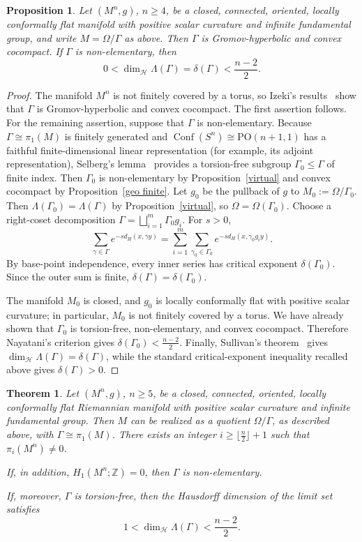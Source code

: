 \documentclass[12pt,oneside,a4paper]{article}
\newtheorem{proposition}[definition]{Proposition}
\theoremstyle{mytheorem}
\newtheorem{theorem}[definition]{Theorem}
\theoremstyle{remark}
\theoremstyle{definition}
\begin{document}
\begin{proposition}\label{prop:standing}
Let $(M^n,g)$, $n\geq4$, be a closed, connected, oriented, locally
conformally flat manifold with positive scalar curvature and infinite
fundamental group, and write $M=\Omega/\Gamma$ as above. Then $\Gamma$ is
Gromov-hyperbolic and convex
cocompact. If $\Gamma$ is non-elementary, then
\[
0<\dim_{\mathcal H}\Lambda(\Gamma)=\delta(\Gamma)<\frac{n-2}{2}.
\]
\end{proposition}

\begin{proof}
The manifold $M^n$ is not finitely covered by a torus, so
Izeki's results~\cite[Theorems~2 and~3]{zbMATH01785298} show that $\Gamma$ is
Gromov-hyperbolic and convex cocompact. The first assertion follows. For the
remaining assertion, suppose that $\Gamma$ is non-elementary. Because
$\Gamma\cong\pi_1(M)$ is finitely generated and
$\operatorname{Conf}(S^n)\cong\mathrm{PO}(n+1,1)$ has a faithful
finite-dimensional linear representation (for example, its adjoint
representation), Selberg's lemma~\cite{zbMATH03319625} provides a torsion-free subgroup
$\Gamma_0\leq\Gamma$ of finite index. Then $\Gamma_0$ is non-elementary by
Proposition~\ref{virtual} and convex cocompact by
Proposition~\ref{geo finite}. Let $g_0$ be the
pullback of $g$ to $M_0:=\Omega/\Gamma_0$. Then
$\Lambda(\Gamma_0)=\Lambda(\Gamma)$ by Proposition~\ref{virtual}, so
$\Omega=\Omega(\Gamma_0)$. Choose a right-coset decomposition
$\Gamma=\bigsqcup_{i=1}^m\Gamma_0g_i$. For $s>0$,
\[
\sum_{\gamma\in\Gamma}e^{-s d_H(x,\gamma y)}
=\sum_{i=1}^m\sum_{\gamma_0\in\Gamma_0}
e^{-s d_H(x,\gamma_0g_i y)}.
\]
By base-point independence, every inner series has critical exponent
$\delta(\Gamma_0)$. Since the outer sum is finite,
$\delta(\Gamma)=\delta(\Gamma_0)$.

The manifold $M_0$ is closed, and $g_0$ is locally conformally flat with
positive scalar curvature; in particular, $M_0$ is not finitely covered by a
torus. We have already shown that $\Gamma_0$ is torsion-free,
non-elementary, and convex cocompact. Therefore Nayatani's criterion
\cite[Corollary~3.4]{zbMATH01028179} gives
$\delta(\Gamma_0)<\frac{n-2}{2}.$ Finally, Sullivan's
theorem~\cite{zbMATH03903608} gives
$\dim_{\mathcal H}\Lambda(\Gamma)=\delta(\Gamma)$, while the standard
critical-exponent inequality recalled above gives $\delta(\Gamma)>0$.
\end{proof}


\begin{theorem}\label{Kleinian}
Let \( (M^n,g) \), \(n\geq5\), be a closed, connected, oriented, locally conformally flat Riemannian manifold with positive scalar curvature and infinite fundamental group. Then \(M\) can be realized as a quotient \(\Omega/\Gamma\), as described above, with \(\Gamma\cong\pi_1(M)\). There exists an integer
$i \geq \Big\lfloor \frac{n}{2} \Big\rfloor + 1$
such that $\pi_i(M^n) \neq 0$.

If, in addition, \( H_1(M^n;\mathbb{Z}) = 0 \), then \( \Gamma \) is non-elementary.

If, moreover, \(\Gamma\) is torsion-free, then the Hausdorff dimension of the limit set satisfies
\[
1 < \dim_{\mathcal H}\Lambda(\Gamma) < \frac{n-2}{2}.
\]
\end{theorem}
\end{document}

